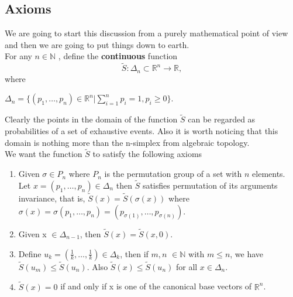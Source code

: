 \documentclass[11pt]{article}
\theoremstyle{plain}
\begin{document}
\subsection*{Axioms}
We are going to start this discussion from a purely mathematical point of view and then we are going to put things down to earth.
\newline
\\
For any $n \in  \mathbb{N}$ , define the \textbf{continuous} function
\begin{equation}
\tilde{S}:\Delta_{n}\subset \mathbb{R}^n\rightarrow \mathbb{R},
\end{equation}
where
\begin{center}
$\Delta_{n} =\{(p_{1},\ldots,p_{n})\in\mathbb{R}^n|\sum_{i=1}^{n}
p_{i}=1, p_{i}\geq 0\}.$
\end{center}

Clearly the points in the domain of the function $\tilde{S}$ can
be regarded as probabilities of a set of exhaustive events. Also
it is worth noticing that this domain is nothing more than the
n-simplex from algebraic topology.
\medskip
\\
We want the function $\tilde{S}$ to satisfy the following axioms

\begin{enumerate}
\item Given $\sigma \in P_{n}$ where $P_{n}$ is the permutation group of
a set with $n$ elements. Let
$x=(p_{1},\ldots,p_{n})\in\Delta_{n}$ then $\tilde{S}$ satisfies
permutation of its arguments invariance, that is,
$\tilde{S}(x)=\tilde{S}(\sigma(x))$ where
$\sigma(x)=\sigma(p_{1},\ldots,p_{n})=(p_{\sigma(1)},\ldots,p_{\sigma(n)})$.
\item Given x $\in\Delta_{n-1}$, then $\tilde{S}(x)=\tilde{S}(x,0)$.
\item Define $u_{k}=(\frac{1}{k},\ldots,\frac{1}{k})\in\Delta_{k}$, then if
$m,n$ $\in\mathbb{N}$ with $m \leq n$, we have
$\tilde{S}(u_{m})\leq\tilde{S}(u_{n})$. Also
$\tilde{S}(x)\leq\tilde{S}(u_{n})$ for all $x\in\Delta_{n}$.
\item $\tilde{S}(x)=0$ if and only if x is one of the canonical base vectors
 of $\mathbb{R}^n$.
\end{enumerate}
\end{document}
